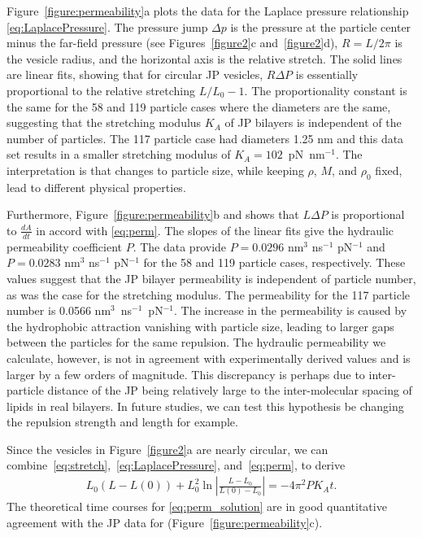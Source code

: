 \documentclass[lineno]{jfm}
\begin{document}
Figure~\ref{figure:permeability}a plots the data for the Laplace
pressure relationship \eqref{eq:LaplacePressure}. The pressure jump
$\Delta p$ is the pressure at the particle center minus the far-field
pressure (see Figures~\ref{figure2}c and~\ref{figure2}d), $R = L/2\pi$
is the vesicle radius, and the horizontal axis is the relative stretch.
The solid lines are linear fits, showing that for circular JP vesicles,
$R\Delta P$ is essentially proportional to the relative stretching
$L/L_0 - 1$. The proportionality constant is the same for the 58 and 119
particle cases where the diameters are the same, suggesting that the
stretching modulus $K_A$ of JP bilayers is independent of the number of
particles. The 117 particle case had diameters 1.25 nm and this data set
results in a smaller stretching modulus of $K_A = 102$~pN~nm$^{-1}$. The
interpretation is that changes to particle size, while keeping $\rho$,
$M$, and $\rho_0$ fixed, lead to different physical properties.

Furthermore, Figure~\ref{figure:permeability}b and shows that $L\Delta
P$ is proportional to $\frac{dA}{dt}$ in accord with \eqref{eq:perm}.
The slopes of the linear fits give the hydraulic permeability
coefficient $P$. The data provide $P = 0.0296$ nm$^3$ ns$^{-1}$
pN$^{-1}$ and $P = 0.0283$ nm$^3$ ns$^{-1}$ pN$^{-1}$ for the 58 and 119
particle cases, respectively. These values suggest that the JP bilayer
permeability is independent of particle number, as was the case for the
stretching modulus. The permeability for the 117 particle number is
0.0566 nm$^3$~ns$^{-1}$~pN$^{-1}$. The increase in the permeability is
caused by the hydrophobic attraction vanishing with particle size,
leading to larger gaps between the particles for the same repulsion. The
hydraulic permeability we calculate, however, is not in agreement with
experimentally derived values and is larger by a few orders of
magnitude. This discrepancy is perhaps due to inter-particle distance of
the JP being relatively large to the inter-molecular spacing of lipids
in real bilayers. In future studies, we can test this hypothesis be
changing the repulsion strength and length for example. 

Since the vesicles in Figure~\ref{figure2}a are nearly circular, we can
combine~\eqref{eq:stretch},~\eqref{eq:LaplacePressure},
and~\eqref{eq:perm}, to derive
\begin{align}
\label{eq:perm_solution}
L_0(L-L(0)) + L_0^2 \ln\left|\frac{L-L_0}{L(0)-L_0}\right| = -4\pi^2 P K_A t.
\end{align}
The theoretical time courses for \eqref{eq:perm_solution} are in good
quantitative agreement with the JP data for
(Figure~\ref{figure:permeability}c).
\end{document}
